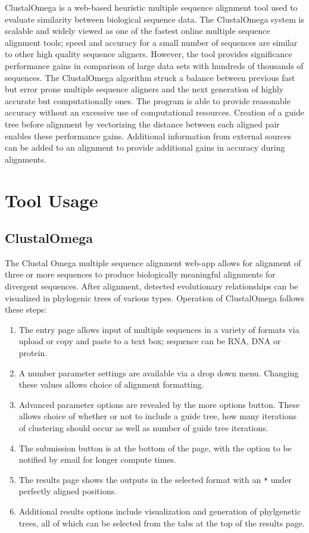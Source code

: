     ClustalOmega is a web-based heuristic multiple sequence alignment tool used to evaluate similarity between biological sequence data.\autocite{B7} The ClustalOmega system is scalable and widely viewed as one of the fastest online multiple sequence alignment tools; speed and accuracy for a small number of sequences are similar to other high quality sequence aligners.\autocite{B7} However, the tool provides significance performance gains in comparison of large data sets with hundreds of thousands of sequences.\autocite{B7} 
    The ClustalOmega algorithm struck a balance between previous fast but error prone multiple sequence aligners and the next generation of highly accurate but computationally ones.\autocite{B7} The program is able to provide reasonable accuracy without an excessive use of computational resources. Creation of a guide tree before alignment by vectorizing the distance between each aligned pair enables these performance gains.\autocite{B7} Additional information from external sources can be added to an alignment to provide additional gains in accuracy during alignments.\autocite{B7}

\section{Tool Usage}

    \subsection{ClustalOmega}
    The Clustal Omega multiple sequence alignment web-app allows for alignment of three or more sequences to produce biologically meaningful alignments for divergent sequences.\autocite{B6} After alignment, detected evolutionary relationships can be visualized in phylogenic trees of various types.\autocite{B6} Operation of ClustalOmega follows these steps:
    \begin{enumerate}
        \item The entry page allows input of multiple sequences in a variety of formats via upload or copy and paste to a text box; sequence can be RNA, DNA or protein.\autocite{B6}
        \item A number parameter settings are available via a drop down menu. Changing these values allows choice of alignment formatting.\autocite{B6}
        \item Advanced parameter options are revealed by the more options button. These allows choice of whether or not to include a guide tree, how many iterations of clustering should occur as well as number of guide tree iterations.\autocite{B6}
        \item The submission button is at the bottom of the page, with the option to be notified by email for longer compute times.\autocite{B6}
        \item The results page shows the outputs in the selected format with an \texttt{*} under perfectly aligned positions.\autocite{B6}
        \item Additional results options include visualization and generation of phylgenetic trees, all of which can be selected from the tabs at the top of the results page.\autocite{B6}
    \end{enumerate}
    
